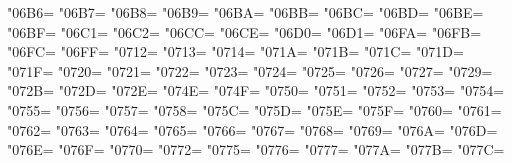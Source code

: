 \XeTeXcharclass"06B6=\KclassArabD
\XeTeXcharclass"06B7=\KclassArabD
\XeTeXcharclass"06B8=\KclassArabD
\XeTeXcharclass"06B9=\KclassArabD
\XeTeXcharclass"06BA=\KclassArabD
\XeTeXcharclass"06BB=\KclassArabD
\XeTeXcharclass"06BC=\KclassArabD
\XeTeXcharclass"06BD=\KclassArabD
\XeTeXcharclass"06BE=\KclassArabD
\XeTeXcharclass"06BF=\KclassArabD
\XeTeXcharclass"06C1=\KclassArabD
\XeTeXcharclass"06C2=\KclassArabD
\XeTeXcharclass"06CC=\KclassArabD
\XeTeXcharclass"06CE=\KclassArabD
\XeTeXcharclass"06D0=\KclassArabD
\XeTeXcharclass"06D1=\KclassArabD
\XeTeXcharclass"06FA=\KclassArabD
\XeTeXcharclass"06FB=\KclassArabD
\XeTeXcharclass"06FC=\KclassArabD
\XeTeXcharclass"06FF=\KclassArabD
\XeTeXcharclass"0712=\KclassArabD
\XeTeXcharclass"0713=\KclassArabD
\XeTeXcharclass"0714=\KclassArabD
\XeTeXcharclass"071A=\KclassArabD
\XeTeXcharclass"071B=\KclassArabD
\XeTeXcharclass"071C=\KclassArabD
\XeTeXcharclass"071D=\KclassArabD
\XeTeXcharclass"071F=\KclassArabD
\XeTeXcharclass"0720=\KclassArabD
\XeTeXcharclass"0721=\KclassArabD
\XeTeXcharclass"0722=\KclassArabD
\XeTeXcharclass"0723=\KclassArabD
\XeTeXcharclass"0724=\KclassArabD
\XeTeXcharclass"0725=\KclassArabD
\XeTeXcharclass"0726=\KclassArabD
\XeTeXcharclass"0727=\KclassArabD
\XeTeXcharclass"0729=\KclassArabD
\XeTeXcharclass"072B=\KclassArabD
\XeTeXcharclass"072D=\KclassArabD
\XeTeXcharclass"072E=\KclassArabD
\XeTeXcharclass"074E=\KclassArabD
\XeTeXcharclass"074F=\KclassArabD
\XeTeXcharclass"0750=\KclassArabD
\XeTeXcharclass"0751=\KclassArabD
\XeTeXcharclass"0752=\KclassArabD
\XeTeXcharclass"0753=\KclassArabD
\XeTeXcharclass"0754=\KclassArabD
\XeTeXcharclass"0755=\KclassArabD
\XeTeXcharclass"0756=\KclassArabD
\XeTeXcharclass"0757=\KclassArabD
\XeTeXcharclass"0758=\KclassArabD
\XeTeXcharclass"075C=\KclassArabD
\XeTeXcharclass"075D=\KclassArabD
\XeTeXcharclass"075E=\KclassArabD
\XeTeXcharclass"075F=\KclassArabD
\XeTeXcharclass"0760=\KclassArabD
\XeTeXcharclass"0761=\KclassArabD
\XeTeXcharclass"0762=\KclassArabD
\XeTeXcharclass"0763=\KclassArabD
\XeTeXcharclass"0764=\KclassArabD
\XeTeXcharclass"0765=\KclassArabD
\XeTeXcharclass"0766=\KclassArabD
\XeTeXcharclass"0767=\KclassArabD
\XeTeXcharclass"0768=\KclassArabD
\XeTeXcharclass"0769=\KclassArabD
\XeTeXcharclass"076A=\KclassArabD
\XeTeXcharclass"076D=\KclassArabD
\XeTeXcharclass"076E=\KclassArabD
\XeTeXcharclass"076F=\KclassArabD
\XeTeXcharclass"0770=\KclassArabD
\XeTeXcharclass"0772=\KclassArabD
\XeTeXcharclass"0775=\KclassArabD
\XeTeXcharclass"0776=\KclassArabD
\XeTeXcharclass"0777=\KclassArabD
\XeTeXcharclass"077A=\KclassArabD
\XeTeXcharclass"077B=\KclassArabD
\XeTeXcharclass"077C=\KclassArabD

